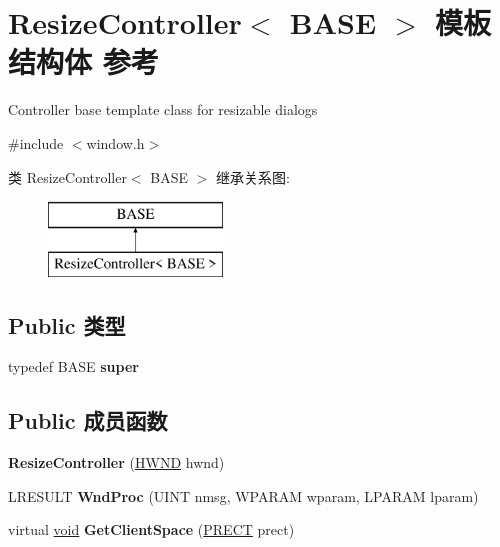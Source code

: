 \hypertarget{struct_resize_controller}{}\section{Resize\+Controller$<$ B\+A\+SE $>$ 模板结构体 参考}
\label{struct_resize_controller}


Controller base template class for resizable dialogs  




{\ttfamily \#include $<$window.\+h$>$}

类 Resize\+Controller$<$ B\+A\+SE $>$ 继承关系图\+:\begin{figure}[H]
\begin{center}
\leavevmode
\includegraphics[height=2.000000cm]{struct_resize_controller}
\end{center}
\end{figure}
\subsection*{Public 类型}
\begin{DoxyCompactItemize}
\item 
\mbox{\label{struct_resize_controller_a6d3c9baf2737379142f0b94794c0b855}} 
typedef B\+A\+SE {\bfseries super}
\end{DoxyCompactItemize}
\subsection*{Public 成员函数}
\begin{DoxyCompactItemize}
\item 
\mbox{\label{struct_resize_controller_af1743e36a20c8e55a125bb73b8bba86e}} 
{\bfseries Resize\+Controller} (\hyperlink{interfacevoid}{H\+W\+ND} hwnd)
\item 
\mbox{\label{struct_resize_controller_a978f2a4f57c8f958d1a67c130ba6aedf}} 
L\+R\+E\+S\+U\+LT {\bfseries Wnd\+Proc} (U\+I\+NT nmsg, W\+P\+A\+R\+AM wparam, L\+P\+A\+R\+AM lparam)
\item 
\mbox{\label{struct_resize_controller_ad9810df89d85668026450d83df1a3d60}} 
virtual \hyperlink{interfacevoid}{void} {\bfseries Get\+Client\+Space} (\hyperlink{structtag_r_e_c_t}{P\+R\+E\+CT} prect)
\end{DoxyCompactItemize}
